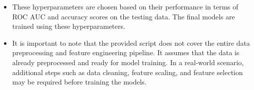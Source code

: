 \documentclass[a4, 10 pt, conference]{ieeeconf}  %
\begin{document}
{\begin{itemize}
\hspace*{0.5cm}Logistic Regression:\newline
\hspace*{1cm}C = 0.1,\\ \hspace*{1cm}class\_weight = \{0: 0.1, 1: 0.9\}\newline
\hspace*{0.5cm}Decision Tree:\newline
\hspace*{1cm}max\_depth = 15,\newline
\hspace*{1cm}class\_weight = 'balanced'\newline
\hspace*{0.5cm}Random Forest:\newline
\hspace*{1cm}n\_estimators = 100,\newline
\hspace*{1cm}max\_features = 'sqrt',\newline
\hspace*{1cm}class\_weight = 'balanced'\newline
\hspace*{0.5cm}Multilayer Perceptron:\newline
\hspace*{1cm}hidden\_layer\_sizes = (50, 50),\newline
\hspace*{1cm}activation = 'relu',\newline
\hspace*{1cm}alpha = 0.0001\newline
\hspace*{0.5cm}AdaBoost:\newline
\hspace*{1cm}n\_estimators = 100,\newline
\hspace*{1cm}estimator =DecisionTreeClassifier(max\_depth=4)

	\item These hyperparameters are chosen based on their performance in terms of ROC AUC and accuracy scores on the testing data. The final models are trained using these hyperparameters.

	\item It is important to note that the provided script does not cover the entire data preprocessing and feature engineering pipeline. It assumes that the data is already preprocessed and ready for model training. In a real-world scenario, additional steps such as data cleaning, feature scaling, and feature selection may be required before training the models. \newline \newline
\end{itemize}
}
\end{document}

